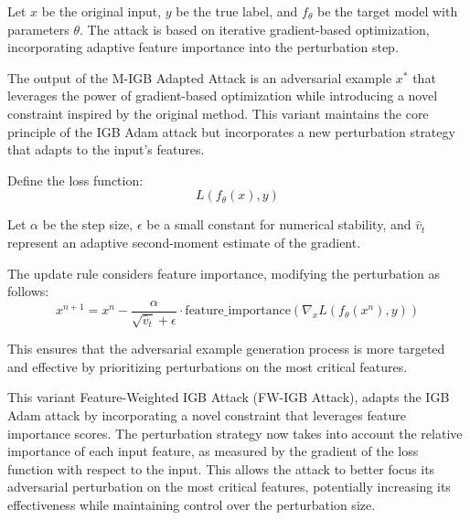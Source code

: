 Let \( x \) be the original input, \( y \) be the true label, and \( f_{\theta} \) be the target model with parameters \( \theta \). The attack is based on iterative gradient-based optimization, incorporating adaptive feature importance into the perturbation step. 

The output of the M-IGB Adapted Attack is an adversarial example $x^*$ that leverages the power of gradient-based optimization while introducing a novel constraint inspired by the original method. This variant maintains the core principle of the IGB Adam attack but incorporates a new perturbation strategy that adapts to the input's features.

Define the loss function:
\[
L(f_{\theta}(x), y)
\]

Let \( \alpha \) be the step size, \( \epsilon \) be a small constant for numerical stability, and \( \hat{v}_t \) represent an adaptive second-moment estimate of the gradient. 

The update rule considers feature importance, modifying the perturbation as follows:
\[
x^{n+1} = x^n - \frac{\alpha}{\sqrt{\hat{v}_t} + \epsilon} \cdot \text{feature_importance} (\nabla_x L(f_\theta(x^n), y))
\]

This ensures that the adversarial example generation process is more targeted and effective by prioritizing perturbations on the most critical features.

This variant Feature-Weighted IGB Attack (FW-IGB Attack), adapts the IGB Adam attack by incorporating a novel constraint that leverages feature importance scores. The perturbation strategy now takes into account the relative importance of each input feature, as measured by the gradient of the loss function with respect to the input. This allows the attack to better focus its adversarial perturbation on the most critical features, potentially increasing its effectiveness while maintaining control over the perturbation size.
